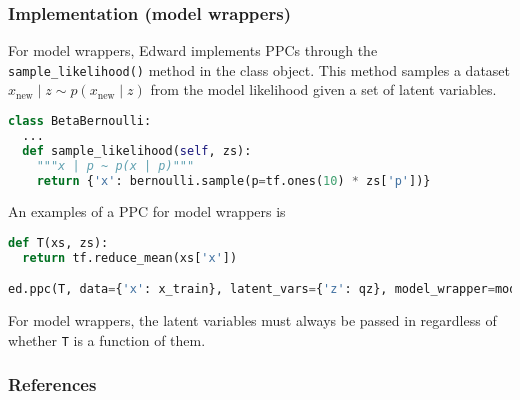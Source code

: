 \subsubsection{Implementation (model wrappers)}

For model wrappers, Edward implements PPCs through the
\texttt{sample_likelihood()} method in the class object. This method
samples a dataset
$x_{\text{new}}\mid z\sim p(x_{\text{new}}\mid z)$ from the
model likelihood given a set of latent variables.
\begin{lstlisting}[language=Python]
class BetaBernoulli:
  ...
  def sample_likelihood(self, zs):
    """x | p ~ p(x | p)"""
    return {'x': bernoulli.sample(p=tf.ones(10) * zs['p'])}
\end{lstlisting}

An examples of a PPC for model wrappers is
\begin{lstlisting}[language=Python]
def T(xs, zs):
  return tf.reduce_mean(xs['x'])

ed.ppc(T, data={'x': x_train}, latent_vars={'z': qz}, model_wrapper=model)
\end{lstlisting}
For model wrappers, the latent variables must always be
passed in regardless of whether \texttt{T} is a function of them.

\subsubsection{References}\label{references}

